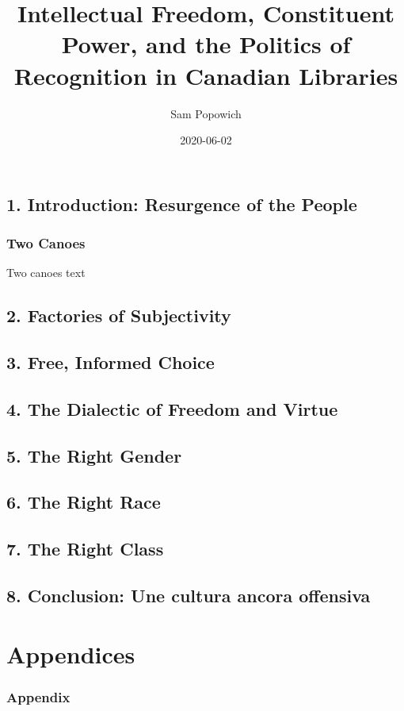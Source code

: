 \documentclass[12pt,oneside]{memoir}
\title{Intellectual Freedom, Constituent Power, and the Politics of Recognition in Canadian Libraries}
\author{Sam Popowich}
\date{2020-06-02}
\begin{document}
\maketitle
\clearpage


\tableofcontents


\newpage
\setcounter{page}{1}

\mainmatter

\chapter{1. Introduction: Resurgence of the People}
\label{scrivauto:5}

\section{Two Canoes}
\label{scrivauto:6}

Two canoes text \cite{Jameson-valences}

\chapter{2. Factories of Subjectivity}
\label{scrivauto:7}

\chapter{3. Free, Informed Choice}
\label{scrivauto:8}

\chapter{4. The Dialectic of Freedom and Virtue}
\label{scrivauto:9}

\chapter{5. The Right Gender}
\label{scrivauto:10}

\chapter{6. The Right Race}
\label{scrivauto:11}

\chapter{7. The Right Class}
\label{scrivauto:12}

\chapter{8. Conclusion: Une cultura ancora offensiva}
\label{scrivauto:13}

\backmatter

\part{Appendices}
\label{scrivauto:15}
\appendix

\section{Appendix}
\label{scrivauto:16}

 

\end{document}
